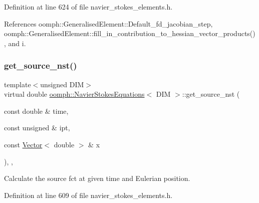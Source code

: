 Definition at line 624 of file navier\+\_\+stokes\+\_\+elements.\+h.



References oomph\+::\+Generalised\+Element\+::\+Default\+\_\+fd\+\_\+jacobian\+\_\+step, oomph\+::\+Generalised\+Element\+::fill\+\_\+in\+\_\+contribution\+\_\+to\+\_\+hessian\+\_\+vector\+\_\+products(), and i.

\mbox{\label{classoomph_1_1NavierStokesEquations_ac2e9128dcc1b15c1b71ec1fa22c181cb}} 
\subsubsection{\texorpdfstring{get\+\_\+source\+\_\+nst()}{get\_source\_nst()}}
{\footnotesize\ttfamily template$<$unsigned D\+IM$>$ \\
virtual double \hyperlink{classoomph_1_1NavierStokesEquations}{oomph\+::\+Navier\+Stokes\+Equations}$<$ D\+IM $>$\+::get\+\_\+source\+\_\+nst (\begin{DoxyParamCaption}\item[{const double \&}]{time,  }\item[{const unsigned \&}]{ipt,  }\item[{const \hyperlink{classoomph_1_1Vector}{Vector}$<$ double $>$ \&}]{x }\end{DoxyParamCaption})\hspace{0.3cm}{\ttfamily [inline]}, {\ttfamily [protected]}, {\ttfamily [virtual]}}



Calculate the source fct at given time and Eulerian position. 



Definition at line 609 of file navier\+\_\+stokes\+\_\+elements.\+h.

\mbox{\label{classoomph_1_1NavierStokesEquations_abf3d6e1353276c4520876a19cdcf588f}} 
